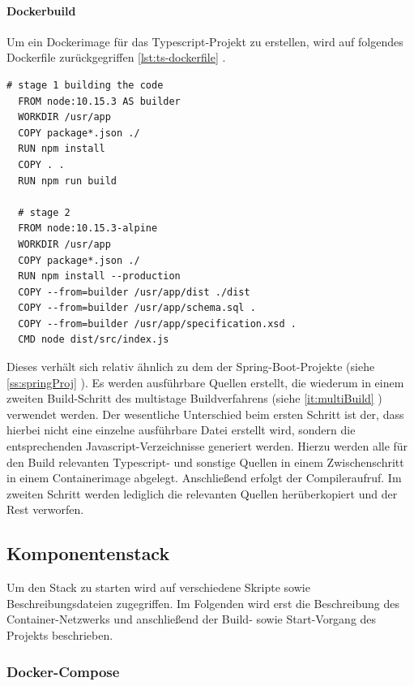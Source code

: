\paragraph{Dockerbuild}
Um ein Dockerimage für das Typescript-Projekt zu erstellen, wird auf folgendes Dockerfile zurückgegriffen \ref{lst:ts-dockerfile} .

\begin{minipage}{\linewidth}
\begin{lstlisting}[style=bashStyle,caption={Dockerfile - Typescript Projekt},label=lst:ts-dockerfile]
  # stage 1 building the code
  FROM node:10.15.3 AS builder
  WORKDIR /usr/app
  COPY package*.json ./
  RUN npm install
  COPY . .
  RUN npm run build 

  # stage 2
  FROM node:10.15.3-alpine
  WORKDIR /usr/app
  COPY package*.json ./
  RUN npm install --production
  COPY --from=builder /usr/app/dist ./dist
  COPY --from=builder /usr/app/schema.sql .
  COPY --from=builder /usr/app/specification.xsd .
  CMD node dist/src/index.js
\end{lstlisting}
\end{minipage}

Dieses verhält sich relativ ähnlich zu dem der Spring-Boot-Projekte (siehe \ref{ss:springProj} ). Es werden ausführbare Quellen erstellt, die wiederum in einem zweiten Build-Schritt des multistage Buildverfahrens (siehe \ref{it:multiBuild} ) verwendet werden. Der wesentliche Unterschied beim ersten Schritt ist der, dass hierbei nicht eine einzelne ausführbare Datei erstellt wird, sondern die entsprechenden Javascript-Verzeichnisse generiert werden. Hierzu werden alle für den Build relevanten Typescript- und sonstige Quellen in einem Zwischenschritt in einem Containerimage abgelegt. Anschließend erfolgt der Compileraufruf. Im zweiten Schritt werden lediglich die relevanten Quellen herüberkopiert und der Rest verworfen. 


\subsection{Komponentenstack}
Um den Stack zu starten wird auf verschiedene Skripte sowie Beschreibungsdateien zugegriffen. Im Folgenden wird erst die Beschreibung des Container-Netzwerks und anschließend der Build- sowie Start-Vorgang des Projekts beschrieben.

\subsubsection{Docker-Compose}
